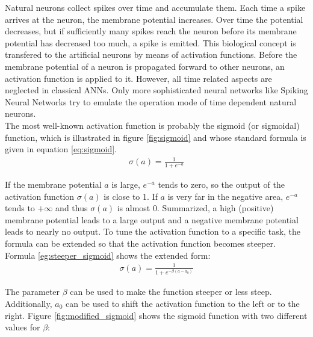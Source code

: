 \documentclass[11pt, a4paper]{article}
\begin{document}
Natural neurons collect spikes over time and accumulate them. Each time a spike arrives at the neuron, the membrane potential increases. Over time the potential decreases, but if sufficiently many spikes reach the neuron before its membrane potential has decreased too much, a spike is emitted. This biological concept is transfered to the artificial neurons by means of activation functions. Before the membrane potential of a neuron is propagated forward to other neurons, an activation function is applied to it. However, all time related aspects are neglected in classical \acp{ANN}. Only more sophisticated neural networks like Spiking Neural Networks try to emulate the operation mode of time dependent natural neurons.\\
The most well-known activation function is probably the sigmoid (or sigmoidal) function, which is illustrated in figure \ref{fig:sigmoid} and whose standard formula is given in equation \eqref{eq:sigmoid}.
\begin{align}
\label{eq:sigmoid}
\sigma(a) = \frac{1}{1 + e^{-a}}
\end{align}



If the membrane potential $a$ is large, $e^{-a}$ tends to zero, so the output of the activation function $\sigma(a)$ is close to 1. If $a$ is very far in the negative area, $e^{-a}$ tends to $+\infty$ and thus $\sigma(a)$ is almost $0$. Summarized, a high (positive) membrane potential leads to a large output and a negative membrane potential leads to nearly no output. To tune the activation function to a specific task, the formula can be extended so that the activation function becomes steeper. Formula \eqref{eg:steeper_sigmoid} shows the extended form:
\begin{align}
\label{eg:steeper_sigmoid}
\sigma(a) = \frac{1}{1 + e^{-\beta (a - a_0)}}
\end{align}

The parameter $\beta$ can be used to make the function steeper or less steep. Additionally, $a_0$ can be used to shift the activation function to the left or to the right. Figure \ref{fig:modified_sigmoid} shows the sigmoid function with two different values for $\beta$:


\end{document}
